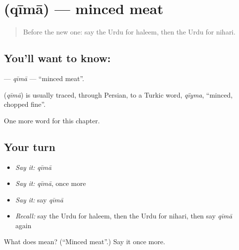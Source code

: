 \section[\texorpdfstring{\ur{قیمہ} (qīmā)}{قیمہ (qīmā)}]{ (qīmā) — minced meat}

\label{lesson:UR-C234-qima}



\begin{quote}
Before the new one: say the Urdu for haleem, then the Urdu for nihari.
\end{quote}

\subsection*{You'll want to know: }
\textbf{} — \emph{qīmā} — \textquotedblleft{}minced meat\textquotedblright{}.

\begin{cousinweb}
\textbf{} (\emph{qīmā}) is usually traced, through Persian, to a Turkic word, \emph{qïyma}, \textquotedblleft{}minced, chopped fine\textquotedblright{}.
\end{cousinweb}

\begin{grammarlens}[title={What you've built}]
One more word for this chapter.
\end{grammarlens}

\subsection*{Your turn}
\begin{itemize}
\raggedright
  \item \emph{Say it:} \emph{qīmā}
  \item \emph{Say it:} \emph{qīmā}, once more
  \item \emph{Say it:} say \emph{qīmā}
  \item \emph{Recall:} say the Urdu for haleem, then the Urdu for nihari, then say \emph{qīmā} again
\end{itemize}

\begin{tcolorbox}[breakable,colback=teal!4,colframe=teal!35!black,title={Before you move on}]
What does  mean? (\textquotedblleft{}Minced meat\textquotedblright{}.) Say it once more.
\end{tcolorbox}

